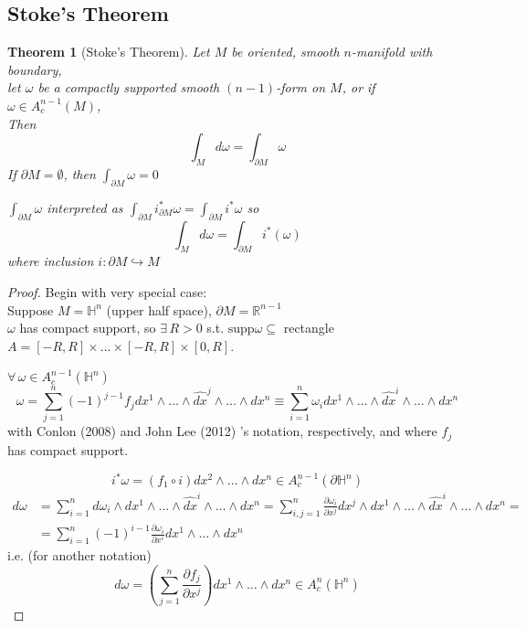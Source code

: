 \documentclass[10pt]{amsart}
\newtheorem{theorem}{Theorem}
\begin{document}
\begin{multicols*}{2}
\section{Stoke's Theorem}

\begin{theorem}[Stoke's Theorem]
	Let $M$ be oriented, smooth $n$-manifold with boundary, \\
	let $\omega$ be a compactly supported smooth $(n-1)$-form on $M$, or if $\omega \in A_c^{n-1}(M)$, \\
	Then
	\begin{equation}
	\int_M d\omega = \int_{\partial M} \omega
	\end{equation} 
	If $\partial M = \emptyset$, then $\int_{\partial M} \omega = 0$
	
	$\int_{\partial M} \omega$ interpreted as $\int_{\partial M} i^*_{\partial M} \omega = \int_{\partial M} i^*\omega$ so 
	\begin{equation}
	\int_M d\omega = \int_{\partial M} i^*(\omega)
	\end{equation}
	where inclusion $i: \partial M \hookrightarrow M$
\end{theorem}

\begin{proof}
Begin with very special case: \\
Suppose $M = \mathbb{H}^n$ (upper half space), $\partial M = \mathbb{R}^{n-1}$ \\
$\omega$ has compact support, so $\exists \, R >0$ s.t. $\text{supp}\omega \subseteq $ rectangle $A=[-R,R] \times \dots \times [-R, R] \times [0,R]$.  

$\forall \, \omega \in A_c^{n-1}(\mathbb{H}^n)$
\begin{equation}
\omega = \sum_{j=1}^n (-1)^{j-1} f_j dx^1 \wedge \dots \wedge \widehat{dx}^j \wedge \dots \wedge dx^n \equiv \sum_{i=1}^n \omega_i dx^1 \wedge \dots \wedge \widehat{dx}^i \wedge \dots \wedge dx^n
\end{equation}
with Conlon (2008) \cite{Conl2008} and John Lee (2012) \cite{JLee2012}'s notation, respectively, and where $f_j$ has compact support.  

\[
i^*\omega = (f_1 \circ i) dx^2 \wedge \dots \wedge dx^n \in A_c^{n-1}(\partial \mathbb{H}^n)
\]
\[ 
\begin{aligned}
d\omega & = \sum_{i=1}^n d\omega_i \wedge dx^1 \wedge \dots \wedge \widehat{dx}^i \wedge \dots \wedge dx^n = \sum_{i,j=1}^n \frac{\partial \omega_i}{ \partial x^j} dx^j \wedge dx^1 \wedge \dots \wedge \widehat{dx}^i \wedge \dots \wedge dx^n = \\
& = \sum_{i=1}^n (-1)^{i-1} \frac{ \partial \omega_i}{ \partial x^i } dx^1 \wedge \dots \wedge dx^n
\end{aligned}
\]
i.e. (for another notation)
\[
d\omega = \left( \sum_{j=1}^n \frac{\partial f_j}{ \partial x^j} \right) dx^1 \wedge \dots \wedge dx^n \in A_c^n(\mathbb{H}^n)
\]


\end{proof}
\end{multicols*}
\end{document}
